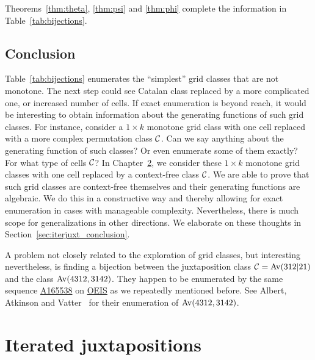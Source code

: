 \documentclass[12pt, a4paper, twoside]{report}
\begin{document}
Theorems~\ref{thm:theta}, \ref{thm:psi} and \ref{thm:phi} complete the information in Table~\ref{tab:bijections}.

\section{Conclusion}
\label{sec:conclusion}

Table~\ref{tab:bijections} enumerates the ``simplest'' grid classes that are not monotone. The next step could see Catalan class replaced by a more complicated one, or increased number of cells. If exact enumeration is beyond reach, it would be interesting to obtain information about the generating functions of such grid classes. For instance, consider a $1\times k$ monotone grid class with one cell replaced with a more complex permutation class $\mathcal{C}$. Can we say anything about the generating function of such classes? Or even enumerate some of them exactly? For what type of cells $\mathcal{C}$? In Chapter~\ref{chap:iterjuxt}, we consider these $1\times k$ monotone grid classes with one cell replaced by a context-free class $\mathcal{C}$. We are able to prove that such grid classes are context-free themselves and their generating functions are algebraic. We do this in a constructive way and thereby allowing for exact enumeration in cases with manageable complexity. Nevertheless, there is much scope for generalizations in other directions. We elaborate on these thoughts in Section~\ref{sec:iterjuxt_conclusion}.

A problem not closely related to the exploration of grid classes, but interesting nevertheless, is finding a bijection between the juxtaposition class $\mathcal{C} = \mathrm{Av}(312|21)$ and the class $\mathrm{Av}(4312, 3142)$. They happen to be enumerated by the same sequence \href{http://oeis.org/A165538}{A165538} on \href{http://oeis.org}{OEIS} as we repeatedly mentioned before. See Albert, Atkinson and Vatter~\cite{albert2012inflations} for their enumeration of $\mathrm{Av}(4312, 3142)$. 



\chapter{Iterated juxtapositions}
\label{chap:iterjuxt}
%
\end{document}
